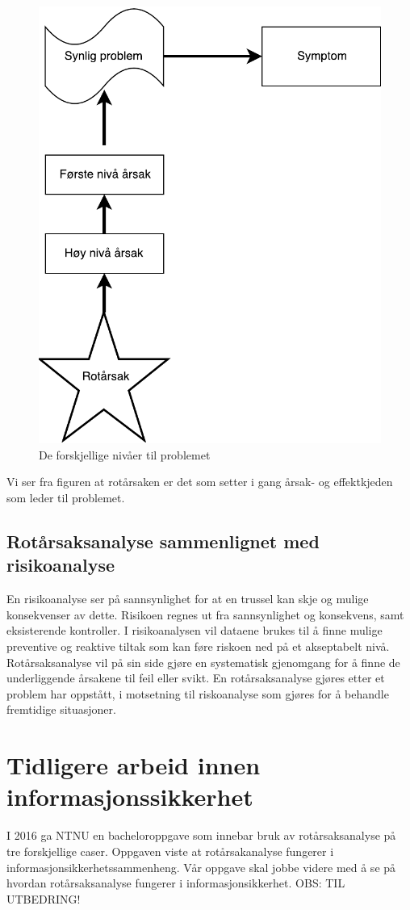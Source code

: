 \begin{figure}[H]
    \centering
    \includegraphics[scale=0.6]{main/bilder/nivaa.pdf}
    \caption[Nivå]{De forskjellige nivåer til problemet}
    \label{fig:nivaa}
\end{figure}

Vi ser fra figuren at rotårsaken er det som setter i gang årsak- og effektkjeden som leder til problemet. 

\subsection{Rotårsaksanalyse sammenlignet med risikoanalyse}
En risikoanalyse ser på sannsynlighet for at en trussel kan skje og mulige konsekvenser av dette. Risikoen regnes ut fra sannsynlighet og konsekvens, samt eksisterende kontroller. I risikoanalysen vil dataene brukes til å finne mulige preventive og reaktive tiltak som kan føre riskoen ned på et akseptabelt nivå. Rotårsaksanalyse vil på sin side gjøre en systematisk gjenomgang for å finne de underliggende årsakene til feil eller svikt. En rotårsaksanalyse gjøres etter et problem har oppstått, i motsetning til riskoanalyse som gjøres for å behandle fremtidige situasjoner.  

\section{Tidligere arbeid innen informasjonssikkerhet}
I 2016 ga NTNU en bacheloroppgave som innebar bruk av rotårsaksanalyse på tre forskjellige caser. Oppgaven viste at rotårsakanalyse fungerer i informasjonsikkerhetssammenheng. Vår oppgave skal jobbe videre med å se på hvordan rotårsaksanalyse fungerer i informasjonsikkerhet. OBS: TIL UTBEDRING!
